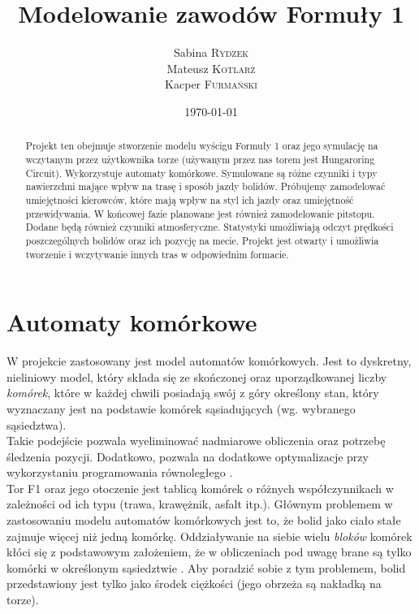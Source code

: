 \documentclass[12p]{extarticle}
\title{Modelowanie zawodów Formuły 1} %
\author{Sabina \textsc{Rydzek} \\ Mateusz \textsc{Kotlarz} \\ Kacper \textsc{Furmański}} %
\date{\today} %
\begin{document}
\maketitle %


\begin{abstract}
Projekt ten obejmuje stworzenie modelu wyścigu Formuły 1 oraz jego symulację na wczytanym przez użytkownika torze (używanym przez nas torem jest Hungaroring Circuit). Wykorzystuje automaty komórkowe. Symulowane są różne czynniki i typy nawierzchni mające wpływ na trasę i sposób jazdy bolidów. Próbujemy zamodelować umiejętności kierowców, które mają wpływ na styl ich jazdy oraz umiejętność przewidywania. W końcowej fazie planowane jest również zamodelowanie pitstopu. Dodane będą również czynniki atmosferyczne. Statystyki umożliwiają odczyt prędkości poszczególnych bolidów oraz ich pozycję na mecie. Projekt jest otwarty i umożliwia tworzenie i wczytywanie innych tras w odpowiednim formacie.
\end{abstract}

\pagebreak


\section{Automaty komórkowe}

W projekcie zastosowany jest model automatów komórkowych. Jest to dyskretny, nieliniowy model, który składa się ze skończonej oraz uporządkowanej liczby \textit{komórek}, które w każdej chwili posiadają swój z góry określony stan, który wyznaczany jest na podstawie komórek sąsiadujących (wg. wybranego sąsiedztwa). \\

Takie podejście pozwala wyeliminować nadmiarowe obliczenia oraz potrzebę śledzenia pozycji. Dodatkowo, pozwala na dodatkowe optymalizacje przy wykorzystaniu programowania równoległego \cite{cellularAutomata}. \\

Tor F1 oraz jego otoczenie jest tablicą komórek o różnych współczynnikach w zależności od ich typu (trawa, krawężnik, asfalt itp.). Głównym problemem w zastosowaniu modelu automatów komórkowych jest to, że bolid jako ciało stałe zajmuje więcej niż jedną komórkę. Oddziaływanie na siebie wielu \textit{bloków} komórek kłóci się z podstawowym założeniem, że w obliczeniach pod uwagę brane są tylko komórki w określonym sąsiedztwie \cite{particleSimulation}. Aby poradzić sobie z tym problemem, bolid przedstawiony jest tylko jako środek ciężkości (jego obrzeża są nakładką na torze). 
\end{document}
